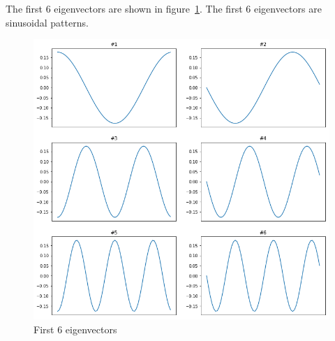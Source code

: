 \documentclass{article}
\begin{document}
The first 6 eigenvectors are shown in figure~\ref{fig:6evec}. The first 6 eigenvectors are sinusoidal patterns. 
\begin{figure}[h!]
\centering
\includegraphics[width=\linewidth]{images/2_b.png}
\caption{First 6 eigenvectors}
\label{fig:6evec}
\end{figure}
\end{document}
